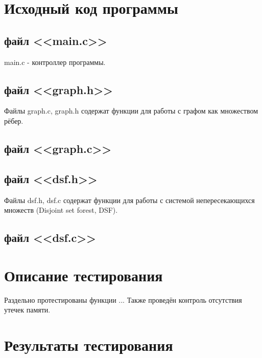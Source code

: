 \documentclass[a4paper,12pt]{article} %
\begin{document}

\setcounter{page}{2}
\tableofcontents
\newpage

\newpage
\section{Исходный код программы}
\subsection{файл <<main.c>>}
main.c - контроллер программы.

\subsection{файл <<graph.h>>}
Файлы graph.c, graph.h содержат функции для работы с графом как множеством рёбер.

\subsection{файл <<graph.c>>}

\subsection{файл <<dsf.h>>}
Файлы dsf.h, dsf.c содержат функции для работы с системой непересекающихся множеств (Disjoint set forest, DSF).

\newpage
\subsection{файл <<dsf.c>>}

\section{Описание тестирования}
Раздельно протестированы функции ... Также проведён контроль отсутствия утечек памяти.
\section{Результаты тестирования}
\end{document}
